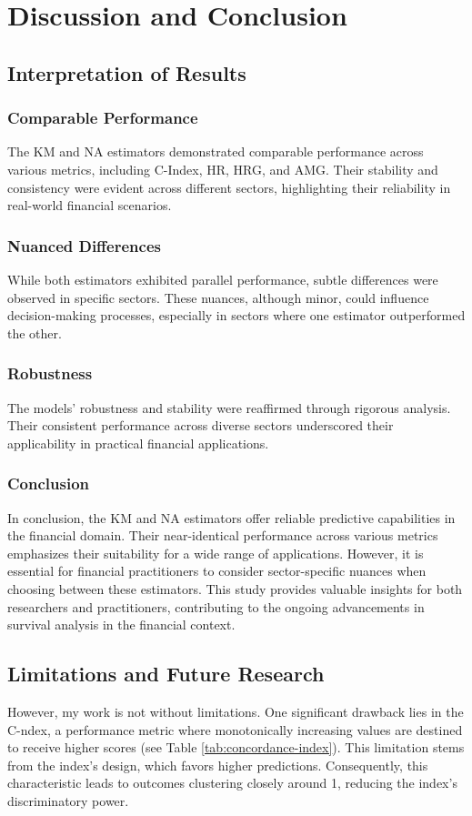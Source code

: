 \chapter{Discussion and Conclusion} \label{Chap6}
\section{Interpretation of Results}
\subsection{Comparable Performance}
The KM and NA estimators demonstrated comparable performance across various metrics, including C-Index, HR, HRG, and AMG. Their stability and consistency were evident across different sectors, highlighting their reliability in real-world financial scenarios.

\subsection{Nuanced Differences}
While both estimators exhibited parallel performance, subtle differences were observed in specific sectors. These nuances, although minor, could influence decision-making processes, especially in sectors where one estimator outperformed the other.

\subsection{Robustness}
The models' robustness and stability were reaffirmed through rigorous analysis. Their consistent performance across diverse sectors underscored their applicability in practical financial applications.

\subsection{Conclusion}
In conclusion, the KM and NA estimators offer reliable predictive capabilities in the financial domain. Their near-identical performance across various metrics emphasizes their suitability for a wide range of applications. However, it is essential for financial practitioners to consider sector-specific nuances when choosing between these estimators. This study provides valuable insights for both researchers and practitioners, contributing to the ongoing advancements in survival analysis in the financial context.

\section{Limitations and Future Research}
However, my work is not without limitations. One significant drawback lies in the C-ndex, a performance metric where monotonically increasing values are destined to receive higher scores (see Table \ref{tab:concordance-index}). This limitation stems from the index's design, which favors higher predictions. Consequently, this characteristic leads to outcomes clustering closely around 1, reducing the index's discriminatory power.

